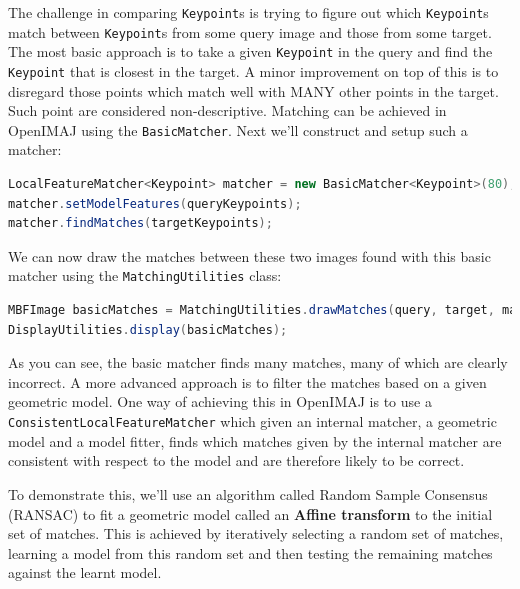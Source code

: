 \documentclass[10pt,a4paper,twoside,extrafontsizes]{memoir}
\begin{document}
The challenge in comparing \verb+Keypoint+s is trying to figure out which \verb+Keypoint+s match 
between \verb+Keypoint+s from some query image and those from some target. The most basic approach 
is to take a given \verb+Keypoint+ in the query and find the \verb+Keypoint+ that is closest in the 
target. A minor improvement on top of this is to disregard those points which match well with MANY
other points in the target. Such point are considered non-descriptive. Matching can be achieved in 
OpenIMAJ using the \verb+BasicMatcher+. Next we'll construct and setup such a matcher:
\begin{lstlisting}[language=java]
LocalFeatureMatcher<Keypoint> matcher = new BasicMatcher<Keypoint>(80);
matcher.setModelFeatures(queryKeypoints);
matcher.findMatches(targetKeypoints);
\end{lstlisting}
We can now draw the matches between these two images found with this basic matcher using the 
\verb+MatchingUtilities+ class:
\begin{lstlisting}[language=java]
MBFImage basicMatches = MatchingUtilities.drawMatches(query, target, matcher.getMatches(), RGBColour.RED);
DisplayUtilities.display(basicMatches);
\end{lstlisting}
As you can see, the basic matcher finds many matches, many of which are clearly incorrect. A more advanced 
approach is to filter the matches based on a given geometric model. One way of achieving this in OpenIMAJ 
is to use a \verb+ConsistentLocalFeatureMatcher+ which given an internal matcher, a geometric model and 
a model fitter, finds which matches given by the internal matcher are consistent with respect to the model
and are therefore likely to be correct.

To demonstrate this, we'll use an algorithm called Random Sample Consensus (RANSAC) to fit a geometric model
called an \textbf{Affine transform} to the initial set of matches. This is achieved by iteratively 
selecting a random set of matches, learning a model from this random set and then testing the 
remaining matches against the learnt model. 
\end{document}
